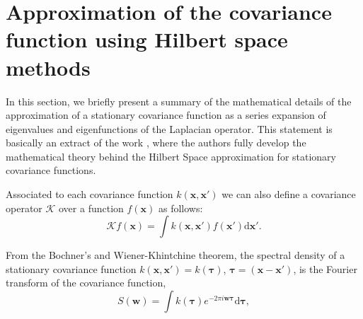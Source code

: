 \documentclass[onecolumn,a4paper,11pt]{article}
\begin{document}




\appendix


\section{Approximation of the covariance function using Hilbert space methods} \label{ch5_app_approx_covfun}


In this section, we briefly present a summary of the mathematical details of the approximation of a stationary covariance function as a series expansion of eigenvalues and eigenfunctions of the Laplacian operator. This statement is basically an extract of the work \cite{solin2018hilbert}, where the authors fully develop the mathematical theory behind the Hilbert Space approximation for stationary covariance functions.

Associated to each covariance function $k(\bm{x},\bm{x}')$ we can also define a covariance operator $\mathcal{K}$ over a function $f(\bm{x})$ as follows:
%
\begin{equation*}
\mathcal{K} f(\bm{x}) = \int k(\bm{x},\bm{x}') f(\bm{x}') \mathrm{d}\bm{x}'.
\end{equation*} 

From the Bochner’s and Wiener-Khintchine theorem, the spectral density of a stationary covariance function $k(\bm{x},\bm{x}') = k(\bm{\tau})$, $\bm{\tau}=(\bm{x}-\bm{x}')$, is the Fourier transform of the covariance function,
%
\begin{equation*}
S(\bm{w}) = \int k(\bm{\tau}) e^{-2\pi i \bm{w} \bm{\tau}} \mathrm{d}\bm{\tau}, \nonumber
\end{equation*}
\end{document}
